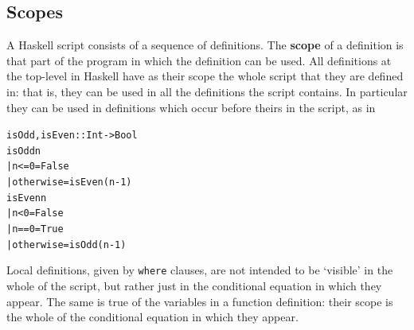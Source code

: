 \subsection*{Scopes}

A Haskell script consists of a sequence of definitions. The \textbf{scope} of
a definition is that part of the program in which the definition can be used.
All definitions at the top-level in Haskell have as their scope the whole script that
they are
defined in: that is, they can be used in all the definitions
the script contains. In particular they can be used in definitions
which occur before theirs in the script, as in
\begin{alltt}
isOdd, isEven :: Int -> Bool
\bl
isOdd n 
  | n<=0        = False
  | otherwise   = isEven (n-1)
\bl
isEven n 
  | n<0         = False
  | n==0        = True
  | otherwise   = isOdd (n-1)
\end{alltt}
Local definitions, given by \texttt{where} clauses, are not intended to be
`visible' in the whole of the script, but rather just in the conditional
equation in which
they appear. The same is true of the variables in a function definition:
their scope is the whole of the conditional equation in which they
appear. 

